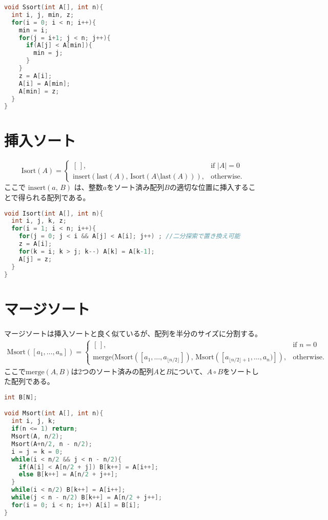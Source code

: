 \documentclass[a4paper,twoside,onecolumn,openany,article,10pt]{memoir}
\theoremstyle{remark}
\begin{document}
\begin{lstlisting}[basicstyle=\ttfamily\normalsize,showstringspaces=false,language=C,frame=single]
void Ssort(int A[], int n){
  int i, j, min, z;
  for(i = 0; i < n; i++){
    min = i;
    for(j = i+1; j < n; j++){
      if(A[j] < A[min]){
        min = j;
      }
    }
    z = A[i];
    A[i] = A[min];
    A[min] = z;
  }
}
\end{lstlisting}

\section{挿入ソート}
\begin{equation*}
\mathrm{Isort}(A) =
\begin{cases}
[\,],&\text{if } |A| = 0\\
\mathrm{insert}(\mathrm{last}(A),\, \mathrm{Isort}(A \setminus \mathrm{last}(A))),& \text{otherwise.}
\end{cases}
\end{equation*}
ここで
$\mathrm{insert}(a,\, B)$
は、整数$a$をソート済み配列$B$の適切な位置に挿入することで得られる配列である。

\begin{lstlisting}[basicstyle=\ttfamily\normalsize,showstringspaces=false,language=C,frame=single]
void Isort(int A[], int n){
  int i, j, k, z;
  for(i = 1; i < n; i++){
    for(j = 0; j < i && A[j] < A[i]; j++) ; //二分探索で置き換え可能
    z = A[i];
    for(k = i; k > j; k--) A[k] = A[k-1];
    A[j] = z;
  }
}
\end{lstlisting}


\section{マージソート}
マージソートは挿入ソートと良く似ているが、配列を半分のサイズに分割する。
\begin{align*}
\mathrm{Msort}([a_1,\dotsc,a_n]) =
\begin{cases}
[\,],& \text{if } n = 0\\
\mathrm{merge}(\mathrm{Msort}([a_1,\dotsc,a_{\lfloor n/2\rfloor}]),\, \mathrm{Msort}([a_{\lfloor n/2\rfloor+1}, \dotsc,a_n)]),& \text{otherwise.}
\end{cases}
\end{align*}
ここで$\mathrm{merge}(A, B)$は2つのソート済みの配列$A$と$B$について、$A\circ B$をソートした配列である。
\begin{lstlisting}[basicstyle=\ttfamily\normalsize,showstringspaces=false,language=C,frame=single]
int B[N];

void Msort(int A[], int n){
  int i, j, k;
  if(n <= 1) return;
  Msort(A, n/2);
  Msort(A+n/2, n - n/2);
  i = j = k = 0;
  while(i < n/2 && j < n - n/2){
    if(A[i] < A[n/2 + j]) B[k++] = A[i++];
    else B[k++] = A[n/2 + j++];
  }
  while(i < n/2) B[k++] = A[i++];
  while(j < n - n/2) B[k++] = A[n/2 + j++];
  for(i = 0; i < n; i++) A[i] = B[i];
}
\end{lstlisting}
\end{document}
